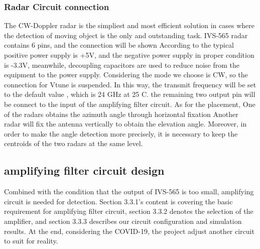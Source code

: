 \subsubsection{Radar Circuit connection}
The CW-Doppler radar is the simpliest and most efficient solution in cases where the detection of moving object is the only and outstanding task. 
IVS-565 radar contains 6 pins, and the connection will be shown According to  \textcite{IVS-565}
the typical positive power supply is +5V, and the negative power supply in proper condition is -3.3V, meanwhile, decoupling capacitors are used to reduce noise from the equipment to the power supply. Considering the mode we choose is CW, so the connection for Vtune is suspended. In this way, the transmit frequency will be set to the default value , which is 24 GHz at 25 C.
the remaining two output pin will be connect to the input of the amplifying filter circuit.
As for the placement, One of the radars obtains the azimuth angle through horizontal fixation
Another radar will fix the antenna vertically to obtain the elevation angle. Moreover, in order to make the angle detection more precisely, it is necessary to keep the centroids of the two radars at the same level. 
\subsection{amplifying filter circuit design}
Combined with the condition that the output of IVS-565 is too small, amplifying circuit is needed for detection. Section 3.3.1’s content is covering the basic requirement for amplifying filter circuit, section 3.3.2 denotes the selection of the amplifier, and section 3.3.3 describes our circuit configuration and simulation results. At the end, considering the COVID-19, the project adjust another circuit to suit for reality.
